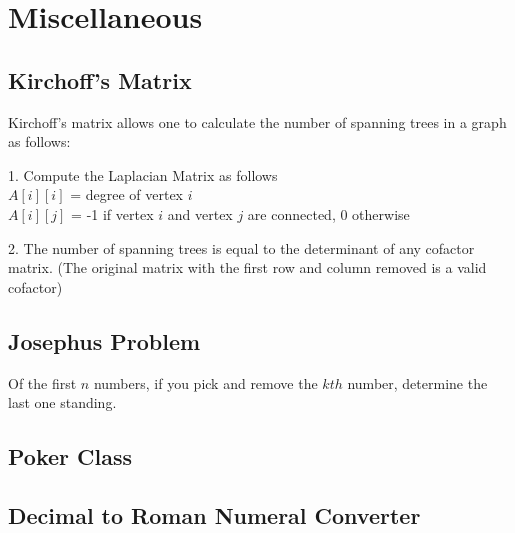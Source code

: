 
\chapter{Miscellaneous}
\chapterinfo{}
	\section{Kirchoff's Matrix}
	Kirchoff's matrix allows one to calculate the number of spanning trees in a 
	graph as follows:
	
	1. Compute the Laplacian Matrix as follows\\
	\indent\indent $A[i][i]$ = degree of vertex $i$\\
	\indent\indent $A[i][j]$ = -1 if vertex $i$ and vertex $j$ are connected, 0 otherwise
	
	2. The number of spanning trees is equal to the determinant of any cofactor 
	matrix. (The original matrix with the first row and column removed is a 
	valid cofactor)
	
	\section{Josephus Problem}
	
	Of the first $n$ numbers, if you pick and remove the $kth$ number, determine the last 
	one standing.
	
	
	
	\section{Poker Class}
	
	
    
	\section{Decimal to Roman Numeral Converter}
	
	

